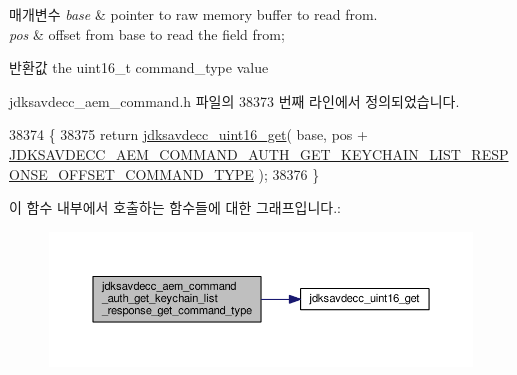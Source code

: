 \begin{DoxyParams}{매개변수}
{\em base} & pointer to raw memory buffer to read from. \\
\hline
{\em pos} & offset from base to read the field from; \\
\hline
\end{DoxyParams}
\begin{DoxyReturn}{반환값}
the uint16\+\_\+t command\+\_\+type value 
\end{DoxyReturn}


jdksavdecc\+\_\+aem\+\_\+command.\+h 파일의 38373 번째 라인에서 정의되었습니다.


\begin{DoxyCode}
38374 \{
38375     \textcolor{keywordflow}{return} \hyperlink{group__endian_ga3fbbbc20be954aa61e039872965b0dc9}{jdksavdecc\_uint16\_get}( base, pos + 
      \hyperlink{group__command__auth__get__keychain__list__response_gaf9b956302fdbabd93c13c916f5a8e19e}{JDKSAVDECC\_AEM\_COMMAND\_AUTH\_GET\_KEYCHAIN\_LIST\_RESPONSE\_OFFSET\_COMMAND\_TYPE}
       );
38376 \}
\end{DoxyCode}


이 함수 내부에서 호출하는 함수들에 대한 그래프입니다.\+:
\nopagebreak
\begin{figure}[H]
\begin{center}
\leavevmode
\includegraphics[width=350pt]{group__command__auth__get__keychain__list__response_gad9d9db5c44de440e9a718bff4ee9f310_cgraph}
\end{center}
\end{figure}


